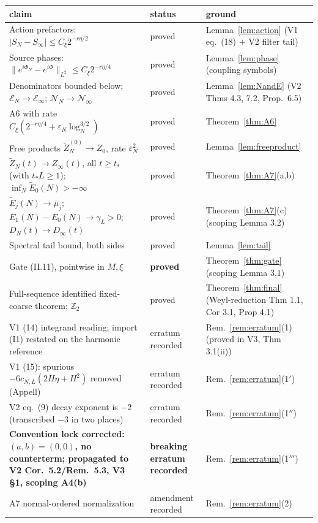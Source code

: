 \documentclass[11pt,a4paper]{article}
\theoremstyle{plain}
\theoremstyle{definition}
\newcommand{\Z}{\mathbb{Z}}
\newcommand{\eps}{\varepsilon}
\newcommand{\logN}{\log_N}
\begin{document}
\begin{longtable}{P{6.1cm}P{2.1cm}P{5.5cm}}
\toprule
claim & status & ground \\
\midrule
\endhead
Action prefactors: $|S_N-S_\infty|\le C_\xi2^{-r\eta/2}$ & proved &
Lemma~\ref{lem:action} (V1 eq.\ (18) $+$ V2 filter tail) \\
Source phases: $\|e^{i\Phi_N}-e^{i\Phi}\|_{L^2}\le C_\xi2^{-r\eta/4}$ &
proved & Lemma~\ref{lem:phase} (coupling symbols) \\
Denominators bounded below; $\mathcal E_N\to\mathcal E_\infty$;
$\mathcal N_N\to\mathcal N_\infty$ & proved & Lemma~\ref{lem:NandE}
(V2 Thms 4.3, 7.2, Prop.\ 6.5) \\
A6 with rate $C_\xi(2^{-r\eta/4}+\eps_N\logN^{3/2})$ & proved &
Theorem~\ref{thm:A6} \\
Free products $\widetilde Z^{(0)}_N\to Z_0$, rate $\eps_N^2$ & proved &
Lemma~\ref{lem:freeproduct} \\
$\widetilde Z_N(t)\to Z_\infty(t)$, all $t\ge t_*$ (with $t_*L\ge1$);
$\inf_N\widetilde E_0(N)>-\infty$ & proved & Theorem~\ref{thm:A7}(a,b) \\
$\widetilde E_j(N)\to\mu_j$; $E_1(N)-E_0(N)\to\gamma_L>0$;
$D_N(t)\to D_\infty(t)$ & proved & Theorem~\ref{thm:A7}(c) (scoping
Lemma 3.2) \\
Spectral tail bound, both sides & proved & Lemma~\ref{lem:tail} \\
Gate (II.11), pointwise in $M,\xi$ & \textbf{proved} &
Theorem~\ref{thm:gate} (scoping Lemma 3.1) \\
Full-sequence identified fixed-coarse theorem; $\Z_2$ & proved &
Theorem~\ref{thm:final} (Weyl-reduction Thm 1.1, Cor 3.1, Prop 4.1) \\
V1 (14) integrand reading; import (I1) restated on the harmonic reference &
erratum recorded & Rem.~\ref{rem:erratum}(1) (proved in V3, Thm 3.1(ii)) \\
V1 (15): spurious $-6c_{N,L}(2H\eta+H^2)$ removed (Appell) & erratum recorded
& Rem.~\ref{rem:erratum}(1$'$) \\
V2 eq.\ (9) decay exponent is $-2$ (transcribed $-3$ in two places) & erratum
recorded & Rem.~\ref{rem:erratum}(1$''$) \\
\textbf{Convention lock corrected: $(a,b)=(0,0)$, no counterterm; propagated
to V2 Cor.\ 5.2/Rem.\ 5.3, V3 \S1, scoping A4(b)} & \textbf{breaking erratum
recorded} & Rem.~\ref{rem:erratum}(1$'''$) \\
A7 normal-ordered normalization & amendment recorded &
Rem.~\ref{rem:erratum}(2) \\

\end{longtable}
\end{document}
